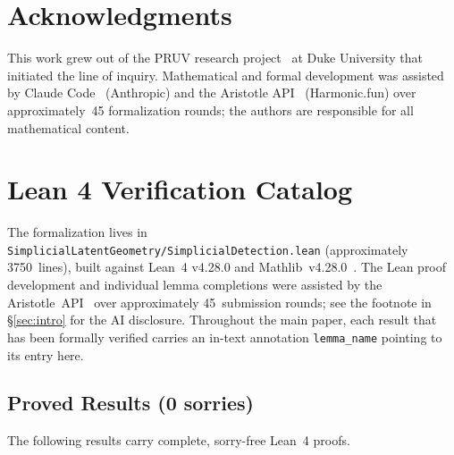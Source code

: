 \documentclass[reqno,12pt]{amsart}
\newcommand{\lean}[1]{\textup{\texttt{\small #1}}}
\theoremstyle{plain}
\theoremstyle{definition}
\theoremstyle{remark}
\begin{document}
\section*{Acknowledgments}

This work grew out of the PRUV research project~\cite{Goh2023} at Duke University that
initiated the line of inquiry. Mathematical and formal development was assisted by Claude
Code~\cite{ClaudeCode2025} (Anthropic) and the Aristotle API~\cite{Aristotle2025}
(Harmonic.fun) over approximately~45 formalization rounds; the authors are responsible for
all mathematical content.

\appendix
\section{Lean 4 Verification Catalog}\label{app:lean}

The formalization lives in \texttt{SimplicialLatentGeometry/SimplicialDetection.lean}
(approximately 3750~lines), built against Lean~4 v4.28.0 and
Mathlib~v4.28.0~\cite{deMoura2021,Mathlib2020}. The Lean proof development and individual
lemma completions were assisted by the Aristotle~API~\cite{Aristotle2025} over approximately
45~submission rounds; see the footnote in \S\ref{sec:intro} for the AI disclosure.
Throughout the main paper, each result that has been formally verified carries an in-text
annotation \lean{lemma\_name} pointing to its entry here.

\subsection*{Proved Results (0 sorries)}

The following results carry complete, sorry-free Lean~4 proofs.
\end{document}
